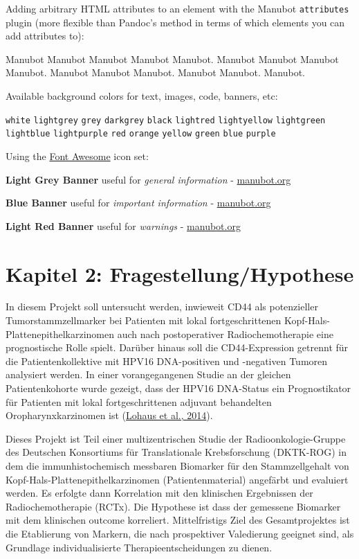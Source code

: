 Adding arbitrary HTML attributes to an element with the Manubot \texttt{attributes} plugin (more flexible than Pandoc's method in terms of which elements you can add attributes to):

Manubot Manubot Manubot Manubot Manubot.
Manubot Manubot Manubot Manubot.
Manubot Manubot Manubot.
Manubot Manubot.
Manubot.

Available background colors for text, images, code, banners, etc:

\texttt{white}
\texttt{lightgrey}
\texttt{grey}
\texttt{darkgrey}
\texttt{black}
\texttt{lightred}
\texttt{lightyellow}
\texttt{lightgreen}
\texttt{lightblue}
\texttt{lightpurple}
\texttt{red}
\texttt{orange}
\texttt{yellow}
\texttt{green}
\texttt{blue}
\texttt{purple}

Using the \href{https://fontawesome.com/}{Font Awesome} icon set:

{ \textbf{Light Grey Banner}
useful for \emph{general information} - \href{https://manubot.org/}{manubot.org}}

{ \textbf{Blue Banner}
useful for \emph{important information} - \href{https://manubot.org/}{manubot.org}}

{ \textbf{Light Red Banner}
useful for \emph{warnings} - \href{https://manubot.org/}{manubot.org}}

\hypertarget{kapitel-2-fragestellunghypothese}{%
\section{Kapitel 2: Fragestellung/Hypothese}\label{kapitel-2-fragestellunghypothese}}

In diesem Projekt soll untersucht werden, inwieweit CD44 als potenzieller Tumorstammzellmarker bei Patienten mit lokal fortgeschrittenen Kopf-Hals- Plattenepithelkarzinomen auch nach postoperativer Radiochemotherapie eine prognostische Rolle spielt. Darüber hinaus soll die CD44-Expression getrennt für die Patientenkollektive mit HPV16 DNA-positiven und -negativen Tumoren analysiert werden. In einer vorangegangenen Studie an der gleichen Patientenkohorte wurde gezeigt, dass der HPV16 DNA-Status ein Prognostikator für Patienten mit lokal fortgeschrittenen adjuvant behandelten Oropharynxkarzinomen ist (\href{about:blank\#_ENREF_52}{Lohaus et al., 2014}).

Dieses Projekt ist Teil einer multizentrischen Studie der Radioonkologie-Gruppe des Deutschen Konsortiums für Translationale Krebsforschung (DKTK-ROG) in dem die immunhistochemisch messbaren Biomarker für den Stammzellgehalt von Kopf-Hals-Plattenepithelkarzinomen (Patientenmaterial) angefärbt und evaluiert werden. Es erfolgte dann Korrelation mit den klinischen Ergebnissen der Radiochemotherapie (RCTx). Die Hypothese ist dass der gemessene Biomarker mit dem klinischen outcome korreliert. Mittelfristigs Ziel des Gesamtprojektes ist die Etablierung von Markern, die nach prospektiver Valedierung geeignet sind, als Grundlage individualisierte Therapieentscheidungen zu dienen.

